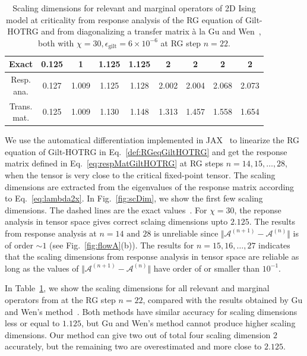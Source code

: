 \documentclass[aps,prb,reprint,superscriptaddress]{revtex4-2}
\begin{document}
\begin{table}[h]%
\caption{Scaling dimensions for relevant and marginal operators of 2D
Ising model at criticality from response analysis of the RG equation
of Gilt-HOTRG and from diagonalizing a
transfer matrix \`a la Gu and Wen~\cite{GuWen2009}, both with $\chi =
30, \epsilon_{\text{gilt}} = 6\times 10^{-6}$ at RG step $n =
22$.\label{table:scDim}} 
\begin{ruledtabular}
\begin{tabular}{ c c c c c c c c c }
Exact      & 0.125 & 1 & 1.125 & 1.125 & 2 & 2 & 2 & 2 \\
\hline
\thead{Resp.\\ ana.} & 0.127 & 1.009 & 1.125 & 1.128 & 2.002 &
2.004 & 2.068 & 2.073 \\
\thead{Trans.\\ mat.} & 0.125 & 1.009 & 1.130 & 1.148 & 1.313 &
1.457 & 1.558 & 1.654
\end{tabular}
\end{ruledtabular}
\end{table}
%

We use the automatical differentiation implemented in
JAX~\cite{jax2018github} to linearize the RG equation of Gilt-HOTRG in
Eq.~\eqref{def:RGeqGiltHOTRG} and get the response matrix defined in
Eq.~\eqref{eq:respMatGiltHOTRG} at RG steps $n = 14,15,\ldots, 28$, when the
tensor is very close to the critical fixed-point tensor. The scaling
dimensions are extracted from the eigenvalues of the response matrix
according to Eq.~\eqref{eq:lambda2x}. In Fig.~\ref{fig:scDim}, we show
the first few scaling dimensions. The dashed lines are the exact
values~\cite{DiFrancesco1997}. For $\chi = 30$, the reponse analysis in
tensor space gives correct sclaing dimensions upto $2.125$. The results from
response analysis at $n = 14 \text{ and } 28$ is unreliable since $\Vert
\mathcal{A}^{(n+1)} - \mathcal{A}^{(n)}\Vert$ is of order $\sim 1$ (see
Fig.~\ref{fig:flowA}(b)). The results for $n = 15,16,\ldots,27$
indicates that the scaling dimensions from response analysis in tensor
space are reliable as long as the values of $\Vert \mathcal{A}^{(n+1)} -
\mathcal{A}^{(n)}\Vert$ have order of or smaller than $10^{-1}$. 
%

In Table~\ref{table:scDim}, we show the scaling dimensions for all
relevant and marginal operators from at the RG step $n = 22$, compared with
the results obtained by Gu and Wen's method~\cite{GuWen2009}. Both
methods have similar accuracy for scaling dimensions less or equal to
$1.125$, but Gu and Wen's method cannot produce higher scaling
dimensions. Our method can give two out of total four scaling dimension
$2$ accurately, but the remaining two are overestimated and more close
to $2.125$.
%
\end{document}
